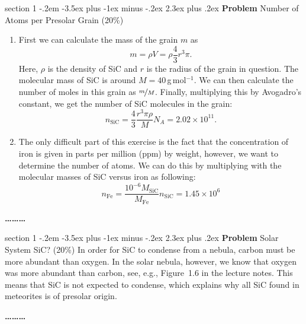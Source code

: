 \documentclass[letterpaper,12pt,twoside=false,DIV=11]{scrartcl}
\makeatletter
\newenvironment{problem}{\@startsection
    {section}
    {1}
    {-.2em}
    {-3.5ex plus -1ex minus -.2ex}
    {2.3ex plus .2ex}
    {
        \pagebreak[3] %
        \noindent\sffamily\bfseries Problem
    }
}
{
    \begin{center}\large\bfseries\ldots\ldots\ldots\end{center}
}
\makeatother
\begin{document}
\begin{problem}{Number of Atoms per Presolar Grain (20\%)}
\begin{enumerate}
    \item First we can calculate the mass of the grain $m$ as
    \begin{equation}
        m = \rho V = \rho \frac{4}{3} r^{3} \pi.
    \end{equation}
    Here, $\rho$ is the density of SiC and $r$ is the radius of the grain in question. The molecular mass of SiC is around $M = 40$\,g\,mol$^{-1}$. We can then calculate the number of moles in this grain as $\nicefrac{m}{M}$. Finally, multiplying this by Avogadro's constant, we get the number of SiC molecules in the grain:
    \begin{equation}
        n_\mathrm{SiC} = \frac{4}{3}\frac{r^3 \pi \rho}{M} N_A = 2.02\times 10^{11}.
    \end{equation}
    \item The only difficult part of this exercise is the fact that the concentration of iron is given in parts per million (ppm) by weight, however, we want to determine the number of atoms. We can do this by multiplying with the molecular masses of SiC versus iron as following:
    \begin{equation}
        n_\mathrm{Fe} = \frac{10^{-6}M_\mathrm{SiC}}{M_\mathrm{Fe}} n_\mathrm{SiC} = 1.45\times10^{6}
    \end{equation}
\end{enumerate}
\end{problem}

\begin{problem}{Solar System SiC? (20\%)}
In order for SiC to condense from a nebula, carbon must be more abundant than oxygen. In the solar nebula, however, we know that oxygen was more abundant than carbon, see, e.g., Figure~1.6 in the lecture notes. This means that SiC is not expected to condense, which explains why all SiC found in meteorites is of presolar origin. 
\end{problem}
\end{document}
